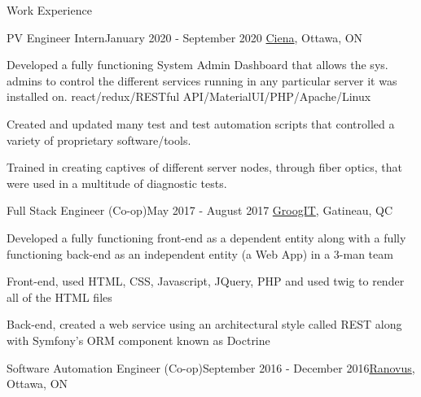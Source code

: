 \documentclass{resume} %
\begin{document}
\begin{rSection}{Work Experience}


\begin{rSubsection}{PV Engineer Intern}{January 2020 - September 2020}
{\href{https://www.ciena.ca/}{Ciena}, Ottawa, ON} {} 

\item Developed a fully functioning System Admin Dashboard that allows the sys. admins to control the different services running in any particular server it was installed on. react/redux/RESTful API/MaterialUI/PHP/Apache/Linux 

\item Created and updated many test and test automation scripts that controlled a variety of proprietary software/tools.

\item Trained in creating captives of different server nodes, through fiber optics, that were used in a multitude of diagnostic tests.

\end{rSubsection}



\begin{rSubsection}{Full Stack Engineer (Co-op)}{May 2017 - August 2017}
{\href{https://www.fr.groogitsolutions.com/}{GroogIT}, Gatineau, QC} {} 

\item Developed a fully functioning front-end as a dependent entity along with a fully functioning back-end as an independent entity (a Web App) in a 3-man team

\item Front-end, used HTML, CSS, Javascript, JQuery, PHP and used twig to render all of the HTML files

\item Back-end, created a web service using an architectural style called REST along with Symfony’s ORM component known as Doctrine

\end{rSubsection}



\begin{rSubsection}{Software Automation Engineer (Co-op)}{September 2016 - December 2016}{\href{https://ranovus.com/}{Ranovus}, Ottawa, ON} {} 


\end{rSubsection}
\end{rSection}
\end{document}
